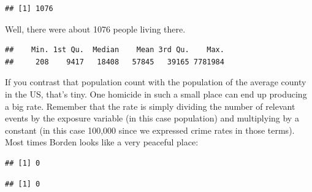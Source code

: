 \documentclass[
  krantz2]{krantz}
\makeatletter
\newenvironment{Shaded}{\begin{snugshade}}{\end{snugshade}}
\newcommand{\FunctionTok}[1]{\textcolor[rgb]{0,0,0}{#1}}
\newcommand{\NormalTok}[1]{#1}
\newcommand{\SpecialCharTok}[1]{\textcolor[rgb]{0,0,0}{#1}}
\newenvironment{kframe}{%
\medskip{}
\setlength{\fboxsep}{.8em}
 \def\at@end@of@kframe{}%
 \ifinner\ifhmode%
  \def\at@end@of@kframe{\end{minipage}}%
  \begin{minipage}{\columnwidth}%
 \fi\fi%
 \def\FrameCommand##1{\hskip\@totalleftmargin \hskip-\fboxsep
 \colorbox{shadecolor}{##1}\hskip-\fboxsep
     \hskip-\linewidth \hskip-\@totalleftmargin \hskip\columnwidth}%
 \MakeFramed {\advance\hsize-\width
   \@totalleftmargin\z@ \linewidth\hsize
   \@setminipage}}%
 {\par\unskip\endMakeFramed%
 \at@end@of@kframe}
\renewenvironment{Shaded}{\begin{kframe}}{\end{kframe}}
\makeatother
\begin{document}
\begin{verbatim}
## [1] 1076
\end{verbatim}

Well, there were about 1076 people living there.

\begin{Shaded}
\end{Shaded}

\begin{verbatim}
##    Min. 1st Qu.  Median    Mean 3rd Qu.    Max. 
##     208    9417   18408   57845   39165 7781984
\end{verbatim}

If you contrast that population count with the population of the average county in the US, that's tiny. One homicide in such a small place can end up producing a big rate. Remember that the rate is simply dividing the number of relevant events by the exposure variable (in this case population) and multiplying by a constant (in this case 100,000 since we expressed crime rates in those terms). Most times Borden looks like a very peaceful place:

\begin{Shaded}
\end{Shaded}

\begin{verbatim}
## [1] 0
\end{verbatim}

\begin{Shaded}
\end{Shaded}

\begin{verbatim}
## [1] 0
\end{verbatim}

\begin{Shaded}
\end{Shaded}
\end{document}
